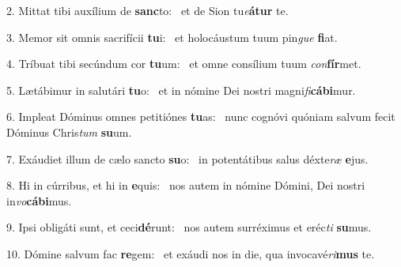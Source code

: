 2. Mittat tibi auxílium de \textbf{sanc}to: \ast\  et de Sion tu\textit{e}\textbf{á}\textbf{tur} te.\

3. Memor sit omnis sacrifícii \textbf{tu}i: \ast\  et holocáustum tuum pin\textit{gue} \textbf{fi}at.\

4. Tríbuat tibi secúndum cor \textbf{tu}um: \ast\  et omne consílium tuum \textit{con}\textbf{fír}met.\

5. Lætábimur in salutári \textbf{tu}o: \ast\  et in nómine Dei nostri magni\textit{fi}\textbf{cá}\textbf{bi}mur.\

6. Impleat Dóminus omnes petitiónes \textbf{tu}as: \ast\  nunc cognóvi quóniam salvum fecit Dóminus Chris\textit{tum} \textbf{su}um.\

7. Exáudiet illum de cælo sancto \textbf{su}o: \ast\  in potentátibus salus déxte\textit{ræ} \textbf{e}jus.\

8. Hi in cúrribus, et hi in \textbf{e}quis: \ast\  nos autem in nómine Dómini, Dei nostri in\textit{vo}\textbf{cá}\textbf{bi}mus.\

9. Ipsi obligáti sunt, et ceci\textbf{dé}runt: \ast\  nos autem surréximus et eréc\textit{ti} \textbf{su}mus.\

10. Dómine salvum fac \textbf{re}gem: \ast\  et exáudi nos in die, qua invocavé\textit{ri}\textbf{mus} te.\

